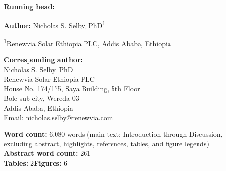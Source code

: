 \documentclass[11pt]{article}
\begin{document}
{\Large\bfseries \papertitle\par}

\textbf{Running head:} \shorttitle

\textbf{Author:} Nicholas S. Selby, PhD\textsuperscript{1}

\textsuperscript{1}Renewvia Solar Ethiopia PLC, Addis Ababa, Ethiopia

\textbf{Corresponding author:}\\
Nicholas S. Selby, PhD\,\\
Renewvia Solar Ethiopia PLC\\
House No. 174/175, Saya Building, 5th Floor\\
Bole sub-city, Woreda 03\\
Addis Ababa, Ethiopia\\
Email: \href{mailto:nicholas.selby@renewvia.com}{nicholas.selby@renewvia.com}

\textbf{Word count:} 6,080 words (main text: Introduction through Discussion, excluding abstract, highlights, references, tables, and figure legends)\\
\textbf{Abstract word count:} 261\\
\textbf{Tables:} 2\quad \textbf{Figures:} 6
\end{document}
